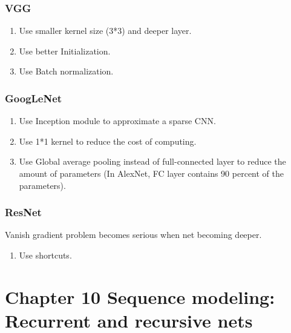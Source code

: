 \documentclass[12pt]{article}
\numberwithin{equation}{section}
\begin{document}
\subsubsection{VGG}
\begin{enumerate}
	\item Use smaller kernel size (3*3) and deeper layer.
	\item Use better Initialization.
	\item Use Batch normalization.
\end{enumerate}
\subsubsection{GoogLeNet}
\begin{enumerate}
	\item Use Inception module to approximate a sparse CNN.
	\item Use 1*1 kernel to reduce the cost of computing.
	\item Use Global average pooling instead of full-connected layer to reduce the amount of parameters (In AlexNet, FC layer contains 90 percent of the parameters).
\end{enumerate}
\subsubsection{ResNet}
Vanish gradient problem becomes serious when net becoming deeper.
\begin{enumerate}
	\item Use shortcuts.
\end{enumerate}
\section{Chapter 10 Sequence modeling: Recurrent and recursive nets}
\end{document}
